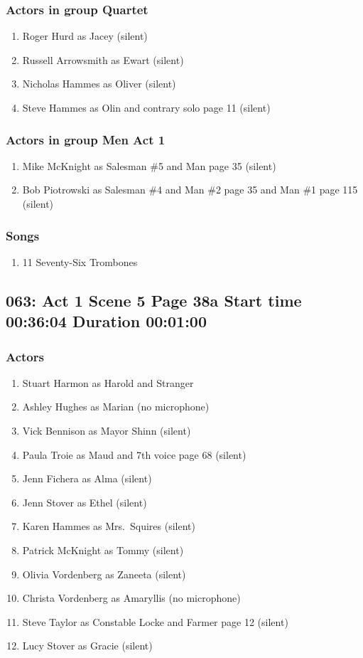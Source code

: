 \subsubsection{Actors in group Quartet}
\begin{enumerate}
\item Roger Hurd as Jacey (silent)
\item Russell Arrowsmith as Ewart (silent)
\item Nicholas Hammes as Oliver (silent)
\item Steve Hammes as Olin and contrary solo page 11 (silent)
\end{enumerate}
\subsubsection{Actors in group Men Act 1}
\begin{enumerate}
\item Mike McKnight as Salesman \#5 and Man page 35 (silent)
\item Bob Piotrowski as Salesman \#4 and Man \#2 page 35 and Man \#1 page 115 (silent)
\end{enumerate}

\subsubsection{Songs}
\begin{enumerate}
\item 11 Seventy-Six Trombones
\end{enumerate}
\subsection{063: Act 1 Scene 5 Page 38a Start time 00:36:04 Duration 00:01:00}

\subsubsection{Actors}
\begin{enumerate}
\item Stuart Harmon as Harold and Stranger
\item Ashley Hughes as Marian (no microphone)
\item Vick Bennison as Mayor Shinn (silent)
\item Paula Troie as Maud and 7th voice page 68 (silent)
\item Jenn Fichera as Alma (silent)
\item Jenn Stover as Ethel (silent)
\item Karen Hammes as Mrs.~Squires (silent)
\item Patrick McKnight as Tommy (silent)
\item Olivia Vordenberg as Zaneeta (silent)
\item Christa Vordenberg as Amaryllis (no microphone)
\item Steve Taylor as Constable Locke and Farmer page 12 (silent)
\item Lucy Stover as Gracie (silent)
\end{enumerate}
